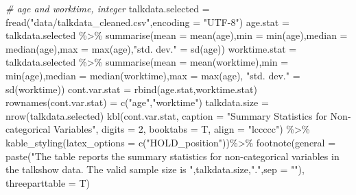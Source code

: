 \documentclass[
  12pt,
]{article}
\newenvironment{Shaded}{\begin{snugshade}}{\end{snugshade}}
\newcommand{\AttributeTok}[1]{\textcolor[rgb]{0.77,0.63,0.00}{#1}}
\newcommand{\CommentTok}[1]{\textcolor[rgb]{0.56,0.35,0.01}{\textit{#1}}}
\newcommand{\DecValTok}[1]{\textcolor[rgb]{0.00,0.00,0.81}{#1}}
\newcommand{\FunctionTok}[1]{\textcolor[rgb]{0.00,0.00,0.00}{#1}}
\newcommand{\NormalTok}[1]{#1}
\newcommand{\OtherTok}[1]{\textcolor[rgb]{0.56,0.35,0.01}{#1}}
\newcommand{\SpecialCharTok}[1]{\textcolor[rgb]{0.00,0.00,0.00}{#1}}
\newcommand{\StringTok}[1]{\textcolor[rgb]{0.31,0.60,0.02}{#1}}
\begin{document}
\begin{Shaded}
\begin{Highlighting}[]
\CommentTok{\# age and worktime, integer}
\NormalTok{talkdata.selected }\OtherTok{=} \FunctionTok{fread}\NormalTok{(}\StringTok{"data/talkdata\_cleaned.csv"}\NormalTok{,}\AttributeTok{encoding =} \StringTok{"UTF{-}8"}\NormalTok{)}
\NormalTok{age.stat }\OtherTok{=}\NormalTok{ talkdata.selected }\SpecialCharTok{\%\textgreater{}\%} 
  \FunctionTok{summarise}\NormalTok{(}\AttributeTok{mean =} \FunctionTok{mean}\NormalTok{(age),}\AttributeTok{min =} \FunctionTok{min}\NormalTok{(age),}\AttributeTok{median =} \FunctionTok{median}\NormalTok{(age),}\AttributeTok{max =} \FunctionTok{max}\NormalTok{(age),}\StringTok{"std. dev."} \OtherTok{=} \FunctionTok{sd}\NormalTok{(age))}
\NormalTok{worktime.stat }\OtherTok{=}\NormalTok{ talkdata.selected }\SpecialCharTok{\%\textgreater{}\%} 
  \FunctionTok{summarise}\NormalTok{(}\AttributeTok{mean =} \FunctionTok{mean}\NormalTok{(worktime),}\AttributeTok{min =} \FunctionTok{min}\NormalTok{(age),}\AttributeTok{median =} \FunctionTok{median}\NormalTok{(worktime),}\AttributeTok{max =} \FunctionTok{max}\NormalTok{(age), }\StringTok{"std. dev."} \OtherTok{=} \FunctionTok{sd}\NormalTok{(worktime))}
\NormalTok{cont.var.stat }\OtherTok{=} \FunctionTok{rbind}\NormalTok{(age.stat,worktime.stat)}
\FunctionTok{rownames}\NormalTok{(cont.var.stat) }\OtherTok{=} \FunctionTok{c}\NormalTok{(}\StringTok{"age"}\NormalTok{,}\StringTok{"worktime"}\NormalTok{)}
\NormalTok{talkdata.size }\OtherTok{=} \FunctionTok{nrow}\NormalTok{(talkdata.selected)}
\FunctionTok{kbl}\NormalTok{(cont.var.stat, }\AttributeTok{caption =} \StringTok{"Summary Statistics for Non{-}categorical Variables"}\NormalTok{, }\AttributeTok{digits =} \DecValTok{2}\NormalTok{, }\AttributeTok{booktabs =}\NormalTok{ T,}
    \AttributeTok{align =} \StringTok{"lccccc"}\NormalTok{) }\SpecialCharTok{\%\textgreater{}\%}
  \FunctionTok{kable\_styling}\NormalTok{(}\AttributeTok{latex\_options =} \FunctionTok{c}\NormalTok{(}\StringTok{"HOLD\_position"}\NormalTok{))}\SpecialCharTok{\%\textgreater{}\%}
   \FunctionTok{footnote}\NormalTok{(}\AttributeTok{general =} \FunctionTok{paste}\NormalTok{(}\StringTok{"The table reports the summary statistics for non{-}categorical variables in the talkshow data. The valid sample size is "}\NormalTok{,talkdata.size,}\StringTok{"."}\NormalTok{,}\AttributeTok{sep =} \StringTok{""}\NormalTok{),}
            \AttributeTok{threeparttable =}\NormalTok{ T)}
\end{Highlighting}
\end{Shaded}
\end{document}
